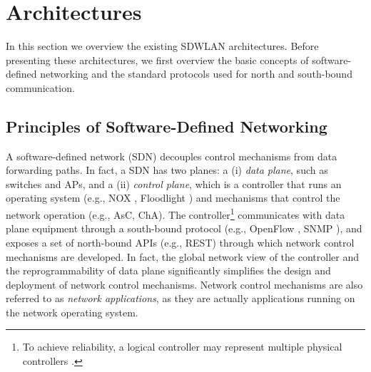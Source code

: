\section{Architectures}
\label{Architectures}
In this section we overview the existing SDWLAN architectures.
Before presenting these architectures, we first overview the basic concepts of software-defined networking and the standard protocols used for north and south-bound communication.




{\color{black!50!black}
\subsection{Principles of Software-Defined Networking}
\label{sdn-intro}
A software-defined network (SDN) decouples control mechanisms from data forwarding paths.
In fact, a SDN has two planes: a (i) \textit{data plane}, such as switches and APs, and a (ii) \textit{control plane}, which is a controller that runs an operating system (e.g., NOX \cite{NOX}, Floodlight \cite{Floodlight}) and mechanisms that control the network operation (e.g., AsC, ChA).
%
The controller\footnote{To achieve reliability, a logical controller may represent multiple physical controllers \cite{Levin2012,SDNscalability}.} communicates with data plane equipment through a south-bound protocol (e.g., OpenFlow \cite{OpenFlow}, SNMP \cite{SNMP}), and exposes a set of north-bound APIs (e.g., REST) through which network control mechanisms are developed.
In fact, the global network view of the controller and the reprogrammability of data plane significantly simplifies the design and deployment of network control mechanisms.
Network control mechanisms are also referred to as \textit{network applications}, as they are actually applications running on the network operating system.
%


}
